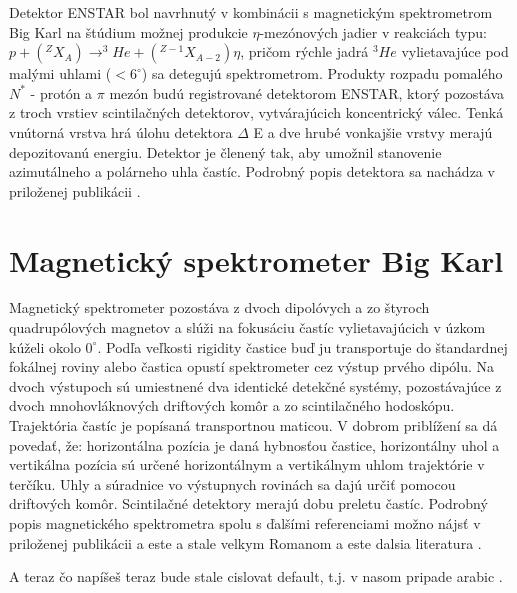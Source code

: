 \documentclass[12pt,oneside,slovak]{book}
\makeatletter
\newcommand{\citeR}[0]{\renewcommand\citeform[1]   %
  {\expandafter\@slowromancap\romannumeral ##1@}}
\newcommand{\cited}[0]{\renewcommand\citeform[1]   %
  {##1}}
\makeatother
\begin{document}
Detektor ENSTAR bol navrhnutý v kombinácii s magnetickým spektrometrom Big Karl
na štúdium možnej produkcie $\eta$-mezónových jadier v reakciách typu:
$p + (^{Z}X_{A}) \rightarrow  ^{3}He + (^{Z-1}X_{A-2})\eta$, pričom rýchle jadrá
$^{3}He$ vylietavajúce pod malými uhlami ($ < 6^{\circ}$) sa detegujú
spektrometrom. Produkty rozpadu pomalého $N^{*}$ - protón a $\pi$  mezón budú
registrované detektorom ENSTAR, ktorý pozostáva z troch vrstiev scintilačných
detektorov, vytvárajúcich koncentrický válec. Tenká vnútorná vrstva hrá úlohu
detektora $\Delta$ E a dve hrubé vonkajšie vrstvy merajú depozitovanú energiu.
Detektor je členený tak, aby umožnil stanovenie azimutálneho a polárneho uhla
častíc. Podrobný popis detektora sa nachádza  v priloženej publikácii
\citeR \cite{EnstarDetector}.

\section{Magnetický spektrometer Big Karl}

Magnetický spektrometer pozostáva z dvoch dipolóvych a zo štyroch quadrupólových
magnetov a slúži na fokusáciu častíc vylietavajúcich v úzkom kúželi okolo
$0^{\circ}$. Podľa veľkosti rigidity častice buď ju transportuje do štandardnej
fokálnej roviny alebo častica opustí spektrometer cez výstup prvého dipólu. Na
dvoch výstupoch sú umiestnené dva identické detekčné systémy, pozostávajúce z
dvoch mnohovláknových driftových komôr a zo scintilačného hodoskópu. Trajektória
častíc je popísaná transportnou maticou. V dobrom priblížení sa dá povedať, že:
horizontálna pozícia je daná hybnosťou častice, horizontálny uhol a vertikálna
pozícia sú určené horizontálnym a vertikálnym uhlom trajektórie v terčíku. Uhly
a súradnice vo výstupnych rovinách sa dajú určiť pomocou driftových komôr.
Scintilačné detektory merajú dobu preletu častíc. Podrobný popis magnetického
spektrometra spolu s ďalšími referenciami možno nájsť v priloženej publikácii
\cite{BigKarl}
a este \cite{QuarkMassDiffViaISBGeWall} a stale velkym Romanom a este dalsia
literatura \cite{PiEtaMixpdResultsBigKarl, BoundEtaJha}.

A teraz čo napíšeš
\cited \cite{PDG2004} teraz bude stale \cite{Ueda} cislovat default, t.j. v
nasom pripade arabic \cite{Willisetal}.
\end{document}
